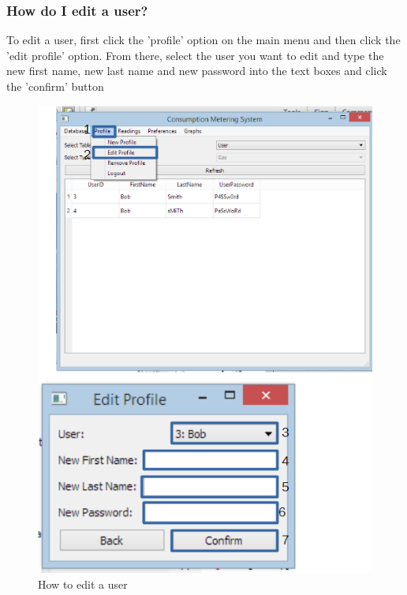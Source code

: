 \subsubsection{How do I edit a user?}\label{question:edit_user}
To edit a user, first click the 'profile' option on the main menu and then click the 'edit profile' option. From there, select the user you want to edit and type the new first name, new last name and new password into the text boxes and click the 'confirm' button
\begin{figure}[H]
	\includegraphics{./manual/images/edit_user.png}
	\caption{How to edit a user}
\end{figure}

